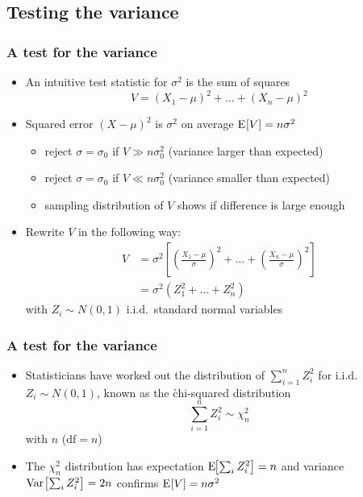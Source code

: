 \documentclass[t]{beamer} %
\begin{document}
\subsection{Testing the variance}

\begin{frame}
  \frametitle{A test for the variance}

  \begin{itemize}
  \item An intuitive test statistic for $\sigma^2$ is the sum of squares
    \[
    V = (X_1 - \mu)^2 + \dots + (X_n - \mu)^2
    \]
  \item Squared error $(X - \mu)^2$ is $\sigma^2$ on average \so
    $\mathrm{E}_{}[V] = n \sigma^2$
    \begin{itemize}
    \item reject $\sigma = \sigma_0$ if $V\gg n \sigma^2_0$ (variance larger than expected)
    \item reject $\sigma = \sigma_0$ if $V\ll n \sigma^2_0$ (variance smaller than expected)
    \item[\hand] sampling distribution of $V$ shows if difference is large
      enough
    \end{itemize}
    \pause
  \item Rewrite $V$ in the following way:
    \begin{align*}
      V &= \sigma^2 \left[
        \left( \frac{X_1 - \mu}{\sigma} \right)^2 + \dots 
        + \left( \frac{X_n - \mu}{\sigma} \right)^2
      \right] \\
      &= \sigma^2 (Z_1^2 + \dots + Z_n^2)
    \end{align*}
    with $Z_i\sim N(0,1)$ i.i.d.\ standard normal variables
  \end{itemize}
\end{frame}

\begin{frame}
  \frametitle{A test for the variance}
  
  \begin{itemize}
  \item Statisticians have worked out the distribution of $\sum_{i=1}^n Z_i^2$
    for i.i.d.\ $Z_i\sim N(0,1)$, known as the \h{chi-squared distribution}
    \[
    \sum_{i=1}^n Z_i^2 \sim \chi^2_n
    \]
    with $n$  ($\text{df} = n$)
  \item The $\chi^2_n$ distribution has expectation $\mathrm{E}_{}\!\bigl[\sum_i Z_i^2\bigr] =
    n$ and variance $\mathop{\mathrm{Var}}_{}\bigl[\sum_i Z_i^2\bigr] = 2n$ \so confirms $\mathrm{E}_{}[V] = n \sigma^2$%
  \end{itemize}
\end{frame}
\end{document}
